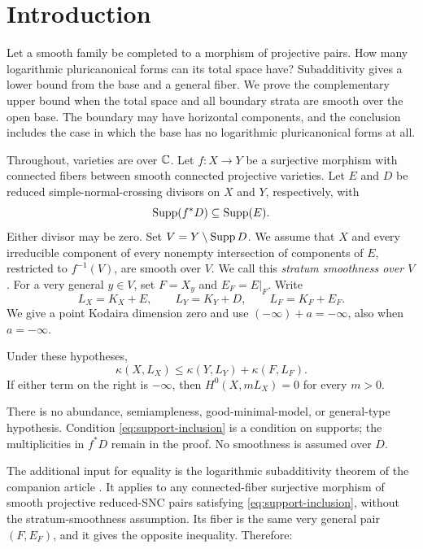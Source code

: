 \section{Introduction}\label{sec:introduction}


Let a smooth family be completed to a morphism of projective pairs.
How many logarithmic pluricanonical forms can its total space have?
Subadditivity gives a lower bound from the base and a general fiber.
We prove the complementary upper bound when the total space and all
boundary strata are smooth over the open base. The boundary may have
horizontal components, and the conclusion includes the case in which
the base has no logarithmic pluricanonical forms at all.

Throughout, varieties are over $\mathbb C$. Let $f:X\to Y$ be a surjective
morphism with connected fibers between smooth connected projective
varieties. Let $E$ and $D$ be reduced simple-normal-crossing divisors
on $X$ and $Y$, respectively, with
\begin{equation}\label{eq:support-inclusion}
 \operatorname{Supp}(f^*D)\subseteq\operatorname{Supp}(E).
\end{equation}
Either divisor may be zero. Set $V=Y\setminus\operatorname{Supp} D$. We assume that
$X$ and every irreducible component of every nonempty intersection of
components of $E$, restricted to $f^{-1}(V)$, are smooth over $V$.
We call this \emph{stratum smoothness over $V$}. For a very general
$y\in V$, set $F=X_y$ and $E_F=E|_F$. Write
\[
 L_X=K_X+E,\qquad L_Y=K_Y+D,\qquad L_F=K_F+E_F.
\]
We give a point Kodaira dimension zero and use
$(-\infty)+a=-\infty$, also when $a=-\infty$.

\begin{theorem}\label{thm:upper-bound}
Under these hypotheses,
\begin{equation}\label{eq:upper-bound}
 \kappa(X,L_X)\leq\kappa(Y,L_Y)+\kappa(F,L_F).
\end{equation}
If either term on the right is $-\infty$, then
$H^0(X,mL_X)=0$ for every $m>0$.
\end{theorem}

There is no abundance, semiampleness, good-minimal-model, or general-type
hypothesis. Condition \eqref{eq:support-inclusion} is a condition on supports;
the multiplicities in $f^*D$ remain in the proof. No smoothness is
assumed over $D$.

The additional input for equality is the logarithmic subadditivity
theorem of the companion article \cite[Corollary~\FoundationLogNumber]{Foundation}.
It applies to any connected-fiber surjective morphism of smooth
projective reduced-SNC pairs satisfying \eqref{eq:support-inclusion}, without
the stratum-smoothness assumption. Its fiber is the same very general
pair $(F,E_F)$, and it gives the opposite inequality. Therefore:

